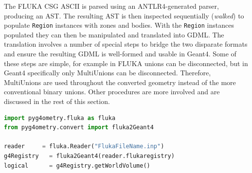 \documentclass[final,5p,times,twocolumn]{elsarticle}
\newcommand{\pyinline}[1]{\lstinline[postbreak={}]{#1}}
\newcommand{\PYGEOMETRY}{\textsc{Pyg4ometry}}
\begin{document}
The FLUKA CSG ASCII is parsed using an ANTLR4-generated parser,
producing an AST.  The resulting AST is then inspected sequentially
(\emph{walked}) to populate \pyinline{Region} instances with zones and bodies.
With the \pyinline{Region} instances populated they can then be manipulated
and translated into GDML.  The translation involves a number of special
steps to bridge the two disparate formats and ensure the resulting GDML is
well-formed and usable in Geant4.  Some of these steps are simple, for
example in FLUKA unions can be disconnected, but in Geant4 specifically
only MultiUnions can be disconnected.  Therefore, MultiUnions are used
throughout the converted geometry instead of the more conventional binary unions.
Other procedures are more involved and are discussed in the rest of this
section.

\begin{lstlisting}[caption={A simple \PYGEOMETRY{} Python script to load a
    FLUKA file and convert its geometry to a Geant4 logical volume.},label={lst:pythonFlukaLoading}, language=Python]
import pyg4ometry.fluka as fluka
from pyg4ometry.convert import fluka2Geant4

reader     = fluka.Reader("FlukaFileName.inp")
g4Registry   = fluka2Geant4(reader.flukaregistry)
logical      = g4Registry.getWorldVolume()
\end{lstlisting}
\end{document}
